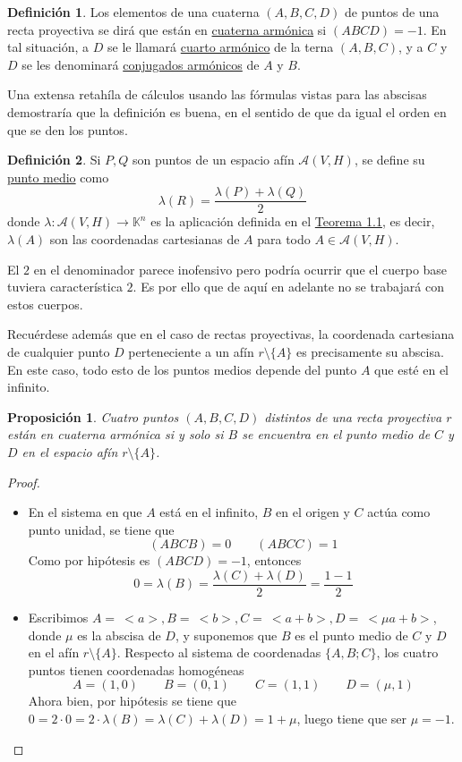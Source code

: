 \documentclass[12pt]{report}
\newtheorem{proposition}{Proposición}[chapter]
\theoremstyle{definition}
\newtheorem{definition}{Definición}[chapter]
\theoremstyle{definition}
\theoremstyle{remark}
\begin{document}
\begin{definition}
Los elementos de una cuaterna $(A, B, C, D)$ de puntos de una recta proyectiva se dirá que están en \ul{cuaterna armónica} si $(ABCD) = -1$. En tal situación, a $D$ se le llamará \ul{cuarto armónico} de la terna $(A,B,C)$, y a $C$ y $D$ se les denominará \ul{conjugados armónicos} de $A$ y $B$.
\end{definition}

Una extensa retahíla de cálculos usando las fórmulas vistas para las abscisas demostraría que la definición es buena, en el sentido de que da igual el orden en que se den los puntos.

\begin{definition}
Si $P,Q$ son puntos de un espacio afín $\mathcal{A}(V,H)$, se define su \ul{punto medio} como
\[\lambda(R) = \frac{\lambda(P)+\lambda(Q)}{2}\]
donde $\displaystyle \lambda \colon \mathcal{A}(V,H) \to \mathbb{K}^n$ es la aplicación definida en el \hyperref[teo1.1.]{\color{blue}Teorema 1.1}, es decir, $\lambda(A)$ son las coordenadas cartesianas de $A$ para todo $A \in \mathcal{A}(V,H)$.
\end{definition}

El $2$ en el denominador parece inofensivo pero podría ocurrir que el cuerpo base tuviera característica $2$. Es por ello que de aquí en adelante no se trabajará con estos cuerpos.

\vspace{2mm}
Recuérdese además que en el caso de rectas proyectivas, la coordenada cartesiana de cualquier punto $D$ perteneciente a un afín $r \setminus \{A\}$ es precisamente su abscisa. En este caso, todo esto de los puntos medios depende del punto $A$ que esté en el infinito.

\begin{proposition}
Cuatro puntos $(A, B, C, D)$ distintos de una recta proyectiva $r$ están en cuaterna armónica si y solo si $B$ se encuentra en el punto medio de $C$ y $D$ en el espacio afín $r \setminus \{A\}$.
\end{proposition}

\begin{proof}
 \hfill
\begin{itemize}
    \item[{\fbox[rb]{$\Rightarrow$}}] En el sistema en que $A$ está en el infinito, $B$ en el origen y $C$ actúa como punto unidad, se tiene que
    \[(ABCB) = 0 \qquad (ABCC) = 1\]
    Como por hipótesis es $(ABCD) = -1$, entonces
    \[0 = \lambda (B) = \frac{\lambda(C)+\lambda(D)}{2} = \frac{1 -1}{2}\]
    \item[{\fbox[rb]{$\Leftarrow$}}] Escribimos $A = \ <a>, B = \ <b>, C = \ <a+b>, D = \ < \mu a +b>$, donde $\mu$ es la abscisa de $D$, y suponemos que $B$ es el punto medio de $C$ y $D$ en el afín $r \setminus \{A\}$. Respecto al sistema de coordenadas $\{A,B;C\}$, los cuatro puntos tienen coordenadas homogéneas
    \[A = (1,0) \qquad B = (0,1) \qquad C = (1,1) \qquad D = (\mu,1)\]
    Ahora bien, por hipótesis se tiene que $0 = 2 \cdot 0 = 2 \cdot \lambda(B) = \lambda(C) + \lambda(D) = 1+\mu$, luego tiene que ser $\mu = -1$.
\end{itemize}
\end{proof}
\end{document}
